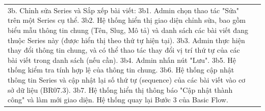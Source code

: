 \documentclass[a4paper,12pt]{article}
\begin{document}
\begin{longtable}{|p{4cm}|p{11.5cm}|}
3b. Chỉnh sửa Series và Sắp xếp bài viết: \newline
3b1. Admin chọn thao tác "Sửa" trên một Series cụ thể. \newline
3b2. Hệ thống hiển thị giao diện chỉnh sửa, bao gồm biểu mẫu thông tin chung (Tên, Slug, Mô tả) và danh sách các bài viết đang thuộc Series này (được hiển thị theo thứ tự hiện tại). \newline
3b3. Admin thực hiện thay đổi thông tin chung, và có thể thao tác thay đổi vị trí thứ tự của các bài viết trong danh sách (nếu cần). \newline
3b4. Admin nhấn nút "Lưu". \newline
3b5. Hệ thống kiểm tra tính hợp lệ của thông tin chung. \newline
3b6. Hệ thống cập nhật thông tin Series và cập nhật lại số thứ tự (sequence) của các bài viết vào cơ sở dữ liệu (BR07.3). \newline
3b7. Hệ thống hiển thị thông báo "Cập nhật thành công" và làm mới giao diện. \newline
Hệ thống quay lại Bước 3 của Basic Flow. \newline


\end{longtable}
\end{document}
